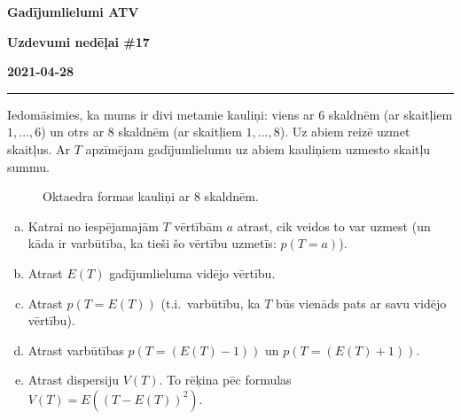 \documentclass[a4paper,12pt]{article}
\begin{document}
\clearpage
\begin{center}
\parbox{3.5cm}{\flushleft\bf Gadījumlielumi \newline ATV} \hfill {\bf\LARGE Uzdevumi nedēļai \#17} \hfill \parbox{3.5cm}{\flushright\bf 2021-04-28} %
\end{center}

\hrule



\vspace{10pt}
\begin{problem}
Iedomāsimies, ka mums ir divi metamie kauliņi: viens ar $6$ skaldnēm (ar skaitļiem $1,\dots,6$) un otrs ar $8$ skaldnēm  
(ar skaitļiem $1,\dots,8$). Uz abiem reizē uzmet skaitļus. Ar $T$ apzīmējam gadījumlielumu \textendash{} uz abiem kauliņiem uzmesto 
skaitļu summu. 
\begin{figure}[!htb]
\caption{\label{fig:octahedron-dice} Oktaedra formas kauliņi ar $8$ skaldnēm.}
\end{figure}
\begin{enumerate}[(a)]
\item Katrai no iespējamajām $T$ vērtībām $a$ atrast, cik veidos to var uzmest (un kāda ir varbūtība, ka tieši šo 
vērtību uzmetīs: $p(T = a)$). 
\item Atrast $E(T)$ \textendash{} gadījumlieluma vidējo vērtību. 
\item Atrast $p(T = E(T))$ (t.i.\ varbūtību, ka $T$ būs vienāds pats ar savu vidējo vērtību).
\item Atrast varbūtības $p(T = (E(T)-1))$ un $p(T = (E(T)+1))$. 
\item Atrast dispersiju $V(T)$. To rēķina pēc formulas $V(T) = E((T - E(T))^2)$.
\end{enumerate}
\end{problem}
\end{document}
